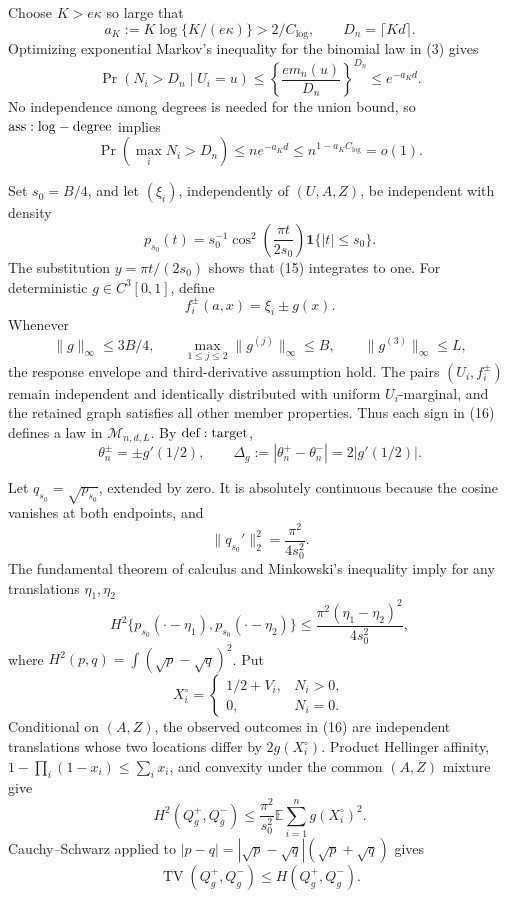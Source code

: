Choose \(K>e\kappa\) so large that
\[
 a_K:=K\log\{K/(e\kappa)\}>2/C_{\log},
 \qquad D_n=\lceil Kd\rceil.
\tag{13}
\]
Optimizing exponential Markov's inequality for the binomial law in (3) gives
\[
 \Pr(N_i>D_n\mid U_i=u)
 \leq\left\{\frac{em_n(u)}{D_n}\right\}^{D_n}
 \leq e^{-a_Kd}.
\]
No independence among degrees is needed for the union bound, so \({\rm ass:log-degree}\) implies
\[
 \Pr\left(\max_iN_i>D_n\right)\leq ne^{-a_Kd}
 \leq n^{1-a_KC_{\log}}=o(1).
\tag{14}
\]

Set \(s_0=B/4\), and let \((\xi_i)\), independently of \((U,A,Z)\), be independent with density
\[
 p_{s_0}(t)=s_0^{-1}\cos^2\!\left(\frac{\pi t}{2s_0}\right)
 \mathbf1\{|t|\leq s_0\}.
\tag{15}
\]
The substitution \(y=\pi t/(2s_0)\) shows that (15) integrates to one.  For deterministic \(g\in C^3[0,1]\), define
\[
 f_i^\pm(a,x)=\xi_i\pm g(x).
\tag{16}
\]
Whenever
\[
 \|g\|_\infty\leq3B/4,
 \qquad \max_{1\leq j\leq2}\|g^{(j)}\|_\infty\leq B,
 \qquad \|g^{(3)}\|_\infty\leq L,
\tag{17}
\]
the response envelope and third-derivative assumption hold.  The pairs \((U_i,f_i^\pm)\) remain independent and identically distributed with uniform \(U_i\)-marginal, and the retained graph satisfies all other member properties.  Thus each sign in (16) defines a law in \(\mathcal M_{n,d,L}\).  By \({\rm def:target}\),
\[
 \theta_n^\pm=\pm g'(1/2),
 \qquad \Delta_g:=|\theta_n^+-\theta_n^-|=2|g'(1/2)|.
\tag{18}
\]

Let \(q_{s_0}=\sqrt{p_{s_0}}\), extended by zero.  It is absolutely continuous because the cosine vanishes at both endpoints, and
\[
 \|q_{s_0}'\|_2^2=\frac{\pi^2}{4s_0^2}.
\tag{19}
\]
The fundamental theorem of calculus and Minkowski's inequality imply for any translations \(\eta_1,\eta_2\)
\[
 H^2\{p_{s_0}(\mathord\cdot-\eta_1),p_{s_0}(\mathord\cdot-\eta_2)\}
 \leq\frac{\pi^2(\eta_1-\eta_2)^2}{4s_0^2},
\tag{20}
\]
where \(H^2(p,q)=\int(\sqrt p-\sqrt q)^2\).  Put
\[
 X_i^\circ=\begin{cases}1/2+V_i,&N_i>0,\\0,&N_i=0.\end{cases}
\]
Conditional on \((A,Z)\), the observed outcomes in (16) are independent translations whose two locations differ by \(2g(X_i^\circ)\).  Product Hellinger affinity, \(1-\prod_i(1-x_i)\leq\sum_i x_i\), and convexity under the common \((A,Z)\) mixture give
\[
 H^2(Q_g^+,Q_g^-)
 \leq\frac{\pi^2}{s_0^2}\mathbb E\sum_{i=1}^ng(X_i^\circ)^2.
\tag{21}
\]
Cauchy--Schwarz applied to \(|p-q|=|\sqrt p-\sqrt q|(\sqrt p+\sqrt q)\) gives
\[
 \operatorname{TV}(Q_g^+,Q_g^-)\leq H(Q_g^+,Q_g^-).
\tag{22}
\]

